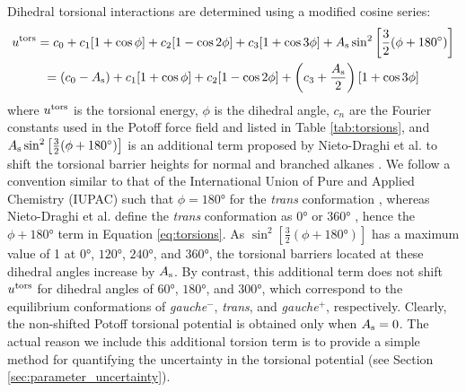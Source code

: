 \documentclass[preprint,review,12pt]{elsarticle}
\begin{document}
	
	Dihedral torsional interactions are determined using a modified cosine series:
	\begin{multline} \label{eq:torsions}
	u^{\rm tors} = c_0 + c_1 [1+\cos{\phi}] + c_2 [1-\cos{2\phi}] + c_3 [1+\cos{3\phi}] + A_{\rm s} \sin^2\left[\frac{3}{2}(\phi + \ang{180})\right] \\ = (c_0 - A_{\rm s}) + c_1 [1+\cos{\phi}] + c_2 [1-\cos{2\phi}] + \left(c_3 + \frac{A_{\rm s}}{2}\right) [1+\cos{3\phi}]
	\end{multline}
	where $u^{\rm tors}$ is the torsional energy, $\phi$ is the dihedral angle, $c_n$ are the Fourier constants used in the Potoff force field and listed in Table \ref{tab:torsions}, and $A_{\rm s} \sin^2\left[\frac{3}{2}(\phi + \ang{180})\right]$ is an additional term proposed by Nieto-Draghi et al. to shift the torsional barrier heights for normal and branched alkanes \cite{Nieto2006,Nieto2008}. We follow a convention similar to that of the International Union of Pure and Applied Chemistry (IUPAC) such that $\phi = \ang{180}$ for the \textit{trans} conformation \cite{Martin1999}, whereas Nieto-Draghi et al. define the \textit{trans} conformation as $\ang{0}$ or $\ang{360}$ \cite{Nieto2006,Nieto2008}, hence the $\phi+\ang{180}$ term in Equation \ref{eq:torsions}. As $\sin^2\left[\frac{3}{2}(\phi + \ang{180})\right]$ has a maximum value of 1 at $\ang{0}$, $\ang{120}$, $\ang{240}$, and $\ang{360}$, the torsional barriers located at these dihedral angles increase by $A_{\rm s}$. By contrast, this additional term does not shift $u^{\rm tors}$ for dihedral angles of $\ang{60}$, $\ang{180}$, and $\ang{300}$, which correspond to the equilibrium conformations of \textit{gauche}$^-$, \textit{trans}, and \textit{gauche}$^+$, respectively. Clearly, the non-shifted Potoff torsional potential is obtained only when $A_{\rm s} = 0$. The actual reason we include this additional torsion term is to provide a simple method for quantifying the uncertainty in the torsional potential (see Section \ref{sec:parameter_uncertainty}). 
	
\end{document}
